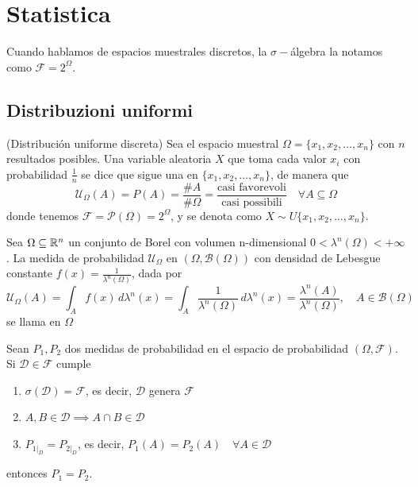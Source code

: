 \chapter{Statistica}
\begin{notacion}
    Cuando hablamos de espacios muestrales discretos, la $\sigma-$álgebra la notamos como $\mathcal{F}= 2^{\Omega}$.
\end{notacion}

\section{Distribuzioni uniformi}

\begin{definicion}(Distribución uniforme discreta)
    Sea el espacio muestral $\Omega = \{x_1, x_2, \ldots, x_n\}$ con $n$ resultados posibles. Una variable aleatoria $X$ que toma cada valor $x_i$ con probabilidad $\frac{1}{n}$ se dice que sigue una  en $\{x_1, x_2, \ldots, x_n\}$, de manera que
    \begin{equation*}
        \mathcal{U}_{\Omega}(A)=P(A)=\dfrac{\#A}{\#\Omega} = \dfrac{\text{casi favorevoli}}{\text{casi possibili}} \quad \forall A \subseteq \Omega
    \end{equation*}
    donde tenemos $\mathcal{F}=\mathcal{P}(\Omega)=2^{\Omega}$, y se denota como $X \sim U\{x_1, x_2, \ldots, x_n\}$.
\end{definicion}


\begin{definicion}
    Sea $\Omega\subseteq \mathbb{R}^n$ un conjunto de Borel con volumen n-dimensional $0 <\lambda^n(\Omega) < +\infty$. La medida de probabilidad $\mathcal{U}_{\Omega}$ en $(\Omega, \mathcal{B}(\Omega))$ con densidad de Lebesgue constante $f(x) = \frac{1}{\lambda^n(\Omega)}$, dada por
    \begin{equation*}
        \mathcal{U}_{\Omega}(A) = \int_A f(x) \, d\lambda^n(x) = \int_A \dfrac{1}{\lambda^n(\Omega)} \, d\lambda^n(x) = \dfrac{\lambda^n(A)}{\lambda^n(\Omega)}, \quad A \in \mathcal{B}(\Omega)
    \end{equation*}
    se llama  en $\Omega$
\end{definicion}

\begin{teo}
    Sean $P_1, P_2$ dos medidas de probabilidad en el espacio de probabilidad $(\Omega, \mathcal{F})$. Si $\mathcal{D}\in \mathcal{F}$ cumple
    \begin{enumerate}[label=\arabic*)]
        \item $\sigma(\mathcal{D}) = \mathcal{F}$, es decir, $\mathcal{D}$ genera $\mathcal{F}$
        \item $A, B\in \mathcal{D} \implies A\cap B\in \mathcal{D}$
        \item $P_{1|_D} = P_{2|_D}$, es decir, $P_1(A) = P_2(A) \quad \forall A\in \mathcal{D}$
    \end{enumerate}
    entonces $P_1 = P_2$.
\end{teo}

